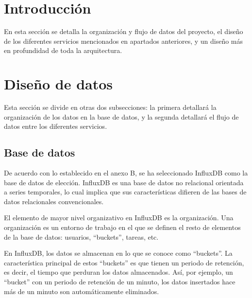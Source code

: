 
\section{Introducción}

En esta sección se detalla la organización y flujo de datos del proyecto, el diseño de los diferentes 
servicios mencionados en apartados anteriores, y un diseño más en profundidad de toda la arquitectura.

\section{Diseño de datos}

Esta sección se divide en otras dos subsecciones: la primera detallará la organización de los datos 
en la base de datos, y la segunda detallará el flujo de datos entre los diferentes servicios.

\subsection{Base de datos}

De acuerdo con lo establecido en el anexo B, se ha seleccionado InfluxDB como la base de datos de elección. 
InfluxDB es una base de datos no relacional orientada a series temporales, lo cual implica que sus 
características difieren de las bases de datos relacionales convencionales.

El elemento de mayor nivel organizativo en InfluxDB es la organización. Una organización es un 
entorno de trabajo en el que se definen el resto de elementos de la base de datos: usuarios, ``buckets'',
tareas, etc.

En InfluxDB, los datos se almacenan en lo que se conoce como ``buckets''. La característica principal
de estos ``buckets'' es que tienen un periodo de retención, es decir, el tiempo que perduran los datos
almacenados. Así, por ejemplo, un ``bucket'' con un periodo de retención de un minuto, los datos insertados
hace más de un minuto son automáticamente eliminados. 


